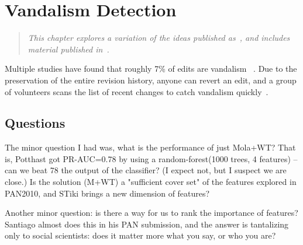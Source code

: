 \chapter{Vandalism Detection}
\label{ch:vandalism}

\begin{quote}
\textit{This chapter explores a variation of the ideas
published as~\cite{Adler2010}, and includes material
published in~\cite{Adler2011}.}
\end{quote}

Multiple studies have found that roughly 7\% of edits are
vandalism~\cite{Potthast2008,Potthast2010a} .
Due to the preservation of the entire revision history,
anyone can revert an edit, and a group of volunteers scans the
list of recent changes to catch vandalism
quickly~\cite{wiki:RCPatrol}.







\section{Questions}


The minor question I had was, what is the performance of just Mola+WT?
That is, Potthast got PR-AUC=0.78 by using a random-forest(1000 trees,
4 features) -- can we beat 78%
the output of the classifier?  (I expect not, but I suspect we are
close.)  Is the solution (M+WT) a "sufficient cover set" of the
features explored in PAN2010, and STiki brings a new dimension of
features?

Another minor question: is there a way for us to rank the importance
of features?  Santiago almost does this in his PAN submission, and the
answer is tantalizing only to social scientists: does it matter more
what you say, or who you are?

